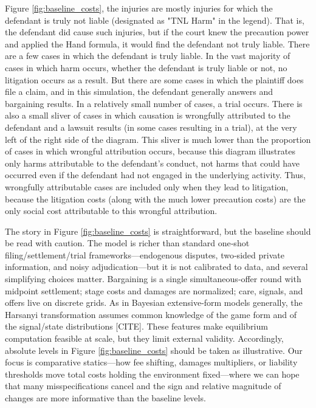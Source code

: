 \documentclass{article}
\begin{document}
Figure \ref{fig:baseline_costs},  the injuries are mostly injuries for which the defendant is truly not liable (designated as "TNL Harm" in the legend). That is, the defendant did cause such injuries, but if the court knew the precaution power and applied the Hand formula, it would find the defendant not truly liable. There are a few cases in which the defendant is truly liable. In the vast majority of cases in which harm occurs, whether the defendant is truly liable or not, no litigation occurs as a result. But there are some cases in which the plaintiff does file a claim, and in this simulation, the defendant generally answers and bargaining results. In a relatively small number of cases, a trial occurs. There is also a small sliver of cases in which causation is wrongfully attributed to the defendant and a lawsuit results (in some cases resulting in a trial), at the very left of the right side of the diagram. This sliver is much lower than the proportion of cases in which wrongful attribution occurs, because this diagram illustrates only harms attributable to the defendant's conduct, not harms that could have occurred even if the defendant had not engaged in the underlying activity. Thus, wrongfully attributable cases are included only when they lead to litigation, because the litigation costs (along with the much lower precaution costs) are the only social cost attributable to this wrongful attribution.

The story in Figure \ref{fig:baseline_costs} is straightforward, but the baseline should be read with caution. The model is richer than standard one‑shot filing/settlement/trial frameworks—endogenous disputes, two‑sided private information, and noisy adjudication—but it is not calibrated to data, and several simplifying choices matter. Bargaining is a single simultaneous‑offer round with midpoint settlement; stage costs and damages are normalized; care, signals, and offers live on discrete grids. As in Bayesian extensive‑form models generally, the Harsanyi transformation assumes common knowledge of the game form and of the signal/state distributions [CITE]. These features make equilibrium computation feasible at scale, but they limit external validity. Accordingly, absolute levels in Figure \ref{fig:baseline_costs} should be taken as illustrative. Our focus is comparative statics—how fee shifting, damages multipliers, or liability thresholds move total costs holding the environment fixed—where we can hope that many misspecifications cancel and the sign and relative magnitude of changes are more informative than the baseline levels.
\end{document}
